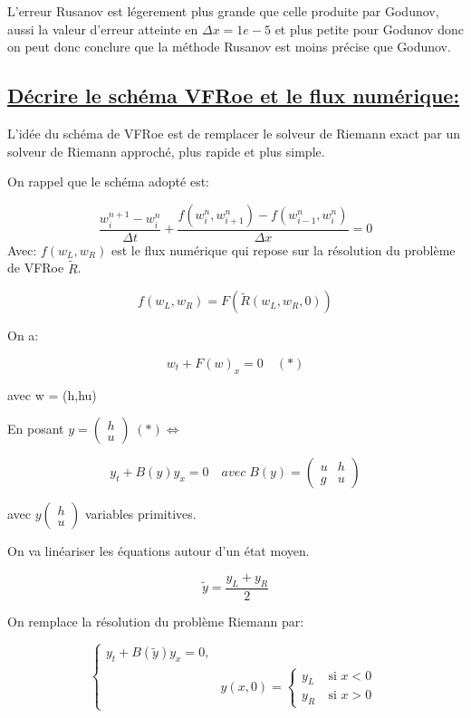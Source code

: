 L'erreur Rusanov est l\'egerement plus grande que celle produite par Godunov, aussi la valeur d'erreur atteinte en $\Delta x = 1e-5$ et plus petite pour Godunov donc on peut donc conclure que la m\'ethode Rusanov est moins pr\'ecise que Godunov.

\subsection[D\'ecrire le sch\'ema VFRoe et le flux num\'erique]{\uline{D\'ecrire le sch\'ema VFRoe et le flux num\'erique:}}

L'id\'ee du sch\'ema de VFRoe est de remplacer le solveur de Riemann exact par un solveur de Riemann approch\'e, plus rapide et plus simple.

On rappel que le sch\'ema adopt\'e est:

$$ \frac {w_i^{n+1} -w_i^n}{\Delta t} + \frac {f(w_{i}^{n},w_{i+1}^{n}) - f(w_{i-1}^{n},w_{i}^{n})}{\Delta x} = 0$$ 
Avec:
$f(w_L, w_R)$ est le flux num\'erique qui repose sur la r\'esolution du probl\`eme de VFRoe $\tilde{R}$.

$$f(w_L, w_R) = F(\tilde{R}(w_L,w_R,0))$$

On a:

$$w_t + F(w)_x = 0 \quad (*)$$

avec w = (h,hu)

En posant $y = \begin{pmatrix}
h\\
u
\end{pmatrix} \; (*) \iff$

$$y_t + B(y)y_x = 0 \quad avec \; B(y) = \begin{pmatrix}
u & h \\
g & u 
\end{pmatrix}$$ 

avec $
y
\begin{pmatrix}
h \\
u 
\end{pmatrix}
$ variables primitives.

On va lin\'eariser les \'equations autour d'un \'etat moyen.

$$\tilde{y} = \frac{y_L+y_R}{2}$$

On remplace la r\'esolution du probl\`eme Riemann par:

\begin{equation}
\label{systeme}
\left \lbrace \begin{array}{rl}
y_t +  B(\tilde{y})y_x= 0, \\
& y(x,0) =
\left \lbrace \begin{array}{rl}
y_L  & ~\text{si }  x < 0\\
y_R  & ~\text{si }  x > 0
\end{array}\right.
\end{array}\right.
\end{equation}

